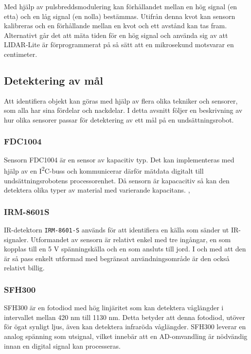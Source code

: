 \documentclass[11pt]{article}
\begin{document}
\begin{flushleft}
Med hjälp av pulsbreddsmodulering kan förhållandet mellan en hög signal (en etta) och en låg signal (en nolla) bestämmas. Utifrån denna kvot kan sensorn kalibreras och en förhållande mellan en kvot och ett avstånd kan tas fram. Alternativt går det att mäta tiden för en hög signal och använda sig av att LIDAR-Lite är förprogrammerat på så sätt att en mikrosekund motsvarar en centimeter. \cite{Lidar}


\subsection{Detektering av mål}
Att identifiera objekt kan göras med hjälp av flera olika tekniker och sensorer, som alla har sina fördelar och nackdelar. I detta avsnitt följer en beskrivning av hur olika sensorer passar för detektering av ett mål på en undsättningsrobot.


\subsubsection{FDC1004} %
Sensorn FDC1004 är en sensor av kapacitiv typ. Det kan implementeras med hjälp av en I\textsuperscript{2}C-buss och kommunicerar därför mätdata digitalt till undsättningsrobotens processorenhet. Då sensorn är kapacacitiv så kan den detektera olika typer av material med varierande kapacitans. \cite{Texas}, \cite{Texas2}

\subsubsection{IRM-8601S} %
IR-detektorn \verb+IRM-8601-S+ används för att identifiera en källa som sänder ut IR-signaler. Utformandet av sensorn är relativt enkel med tre ingångar, en som kopplas till en 5 V spänningskälla och en som ansluts till jord. I och med att den är så pass enkelt utformad med begränsat användningsområde är den också relativt billig. \cite{IRM}

\subsubsection{SFH300} %
SFH300 är en fotodiod med hög linjäritet som kan detektera våglängder i intervallet mellan 420 nm till 1130 nm. Detta betyder att denna fotodiod, utöver för ögat synligt ljus, även kan detektera infraröda våglängder. SFH300 leverar en analog spänning som utsignal, vilket innebär att en AD-omvandling är nödvändig innan en digital signal kan processeras. \cite{Osram}


\end{flushleft}
\end{document}
